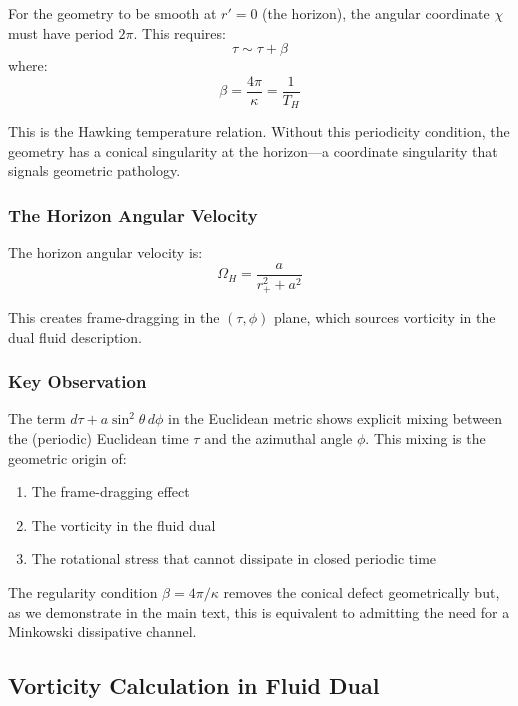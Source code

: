 \documentclass[11pt]{article}
\begin{document}
For the geometry to be smooth at $r' = 0$ (the horizon), the angular coordinate $\chi$ must have period $2\pi$. This requires:
\begin{equation}
\tau \sim \tau + \beta
\end{equation}
where:
\begin{equation}
\boxed{\beta = \frac{4\pi}{\kappa} = \frac{1}{T_H}}
\end{equation}

This is the Hawking temperature relation. Without this periodicity condition, the geometry has a conical singularity at the horizon—a coordinate singularity that signals geometric pathology.

\subsubsection{The Horizon Angular Velocity}

The horizon angular velocity is:
\begin{equation}
\Omega_H = \frac{a}{r_+^2 + a^2}
\end{equation}

This creates frame-dragging in the $(\tau, \phi)$ plane, which sources vorticity in the dual fluid description.

\subsubsection{Key Observation}

The term $d\tau + a\sin^2\theta\, d\phi$ in the Euclidean metric shows explicit mixing between the (periodic) Euclidean time $\tau$ and the azimuthal angle $\phi$. This mixing is the geometric origin of:
\begin{enumerate}
\item The frame-dragging effect
\item The vorticity in the fluid dual
\item The rotational stress that cannot dissipate in closed periodic time
\end{enumerate}

The regularity condition $\beta = 4\pi/\kappa$ removes the conical defect geometrically but, as we demonstrate in the main text, this is equivalent to admitting the need for a Minkowski dissipative channel.

\subsection{Vorticity Calculation in Fluid Dual}
\end{document}
